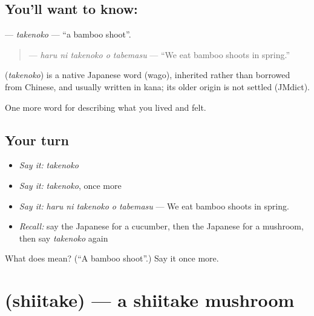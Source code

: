 \subsection*{You'll want to know: }
\textbf{} — \emph{takenoko} — \textquotedblleft{}a bamboo shoot\textquotedblright{}.

\begin{quote}
\textbf{  } — \emph{haru ni takenoko o tabemasu} — \textquotedblleft{}We eat bamboo shoots in spring.\textquotedblright{}
\end{quote}

\begin{cousinweb}
\textbf{} (\emph{takenoko}) is a native Japanese word (wago), inherited rather than borrowed from Chinese, and usually written in kana; its older origin is not settled (JMdict).
\end{cousinweb}

\begin{grammarlens}[title={What you've built}]
One more word for describing what you lived and felt.
\end{grammarlens}

\subsection*{Your turn}
\begin{itemize}
\raggedright
  \item \emph{Say it:} \emph{takenoko}
  \item \emph{Say it:} \emph{takenoko}, once more
  \item \emph{Say it:} \emph{haru ni takenoko o tabemasu} — We eat bamboo shoots in spring.
  \item \emph{Recall:} say the Japanese for a cucumber, then the Japanese for a mushroom, then say \emph{takenoko} again
\end{itemize}

\begin{tcolorbox}[breakable,colback=teal!4,colframe=teal!35!black,title={Before you move on}]
What does  mean? (\textquotedblleft{}A bamboo shoot\textquotedblright{}.) Say it once more.
\end{tcolorbox}
\section[\texorpdfstring{\ja{しいたけ} (shiitake)}{しいたけ (shiitake)}]{ (shiitake) — a shiitake mushroom}


